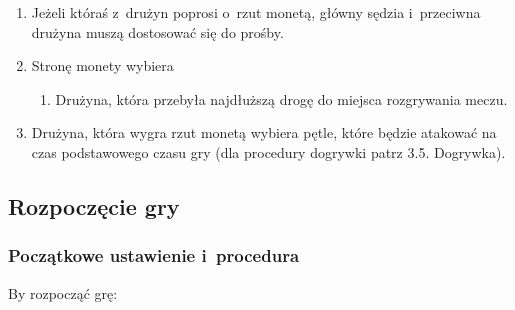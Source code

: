 \documentclass[12pt]{article}
\begin{document}
\begin{enumerate}
	\item
	      Jeżeli któraś z~drużyn poprosi o~rzut monetą, główny sędzia i~przeciwna drużyna muszą dostosować się do prośby.
	\item
	      Stronę monety wybiera

	      \begin{enumerate}
		      \item
		            Drużyna, która przebyła najdłuższą drogę do miejsca rozgrywania
		            meczu.
	      \end{enumerate}
	\item
	      Drużyna, która wygra rzut monetą wybiera pętle, które będzie atakować
	      na czas podstawowego czasu gry (dla procedury dogrywki patrz 3.5.
	      Dogrywka).
\end{enumerate}

\subsection{Rozpoczęcie gry}

\subsubsection{Początkowe ustawienie i~procedura}
By rozpocząć grę:
\end{document}
